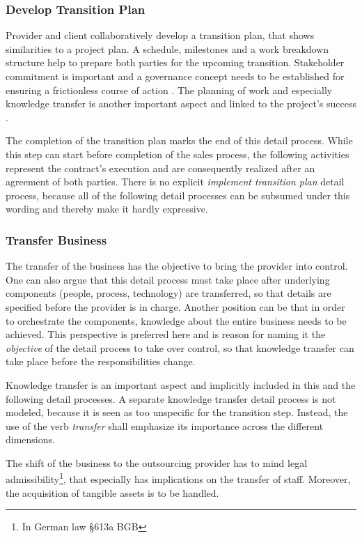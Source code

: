 	\subsubsection{Develop Transition Plan}
	Provider and client collaboratively develop a transition plan, that shows similarities to a project plan. A schedule, milestones and a work breakdown structure help to prepare both parties for the upcoming transition. Stakeholder commitment is important and a governance concept needs to be established for ensuring a frictionless course of action \citep{itgov2005}. The planning of work and especially knowledge transfer is another important aspect and linked to the project's success \citep{deloittehandbook}. 
	
	The completion of the transition plan marks the end of this detail process. While this step can start before completion of the sales process, the following activities represent the contract's execution and are consequently realized after an agreement of both parties. There is no explicit \textit{implement transition plan} detail process, because all of the following detail processes can be subsumed under this wording and thereby make it hardly expressive. 
	
	\subsubsection{Transfer Business}
	
	The transfer of the business has the objective to bring the provider into control. One can also argue that this detail process must take place after underlying components (\ie people, process, technology) are transferred, so that details are specified before the provider is in charge. Another position can be that in order to orchestrate the components, knowledge about the entire business needs to be achieved. This perspective is preferred here and is reason for naming it the \textit{objective} of the detail process to take over control, so that knowledge transfer can take place before the responsibilities change. 
	
	Knowledge transfer is an important aspect and implicitly included in this and the following detail processes. A separate knowledge transfer detail process is not modeled, because it is seen as too unspecific for the transition step. Instead, the use of the verb \textit{transfer} shall emphasize its importance across the different dimensions. 
	
	The shift of the business to the outsourcing provider has to mind legal admissibility\footnote{In German law \cf §613a BGB }, that especially has implications on the transfer of staff. Moreover, the acquisition of tangible assets is to be handled. 
	
